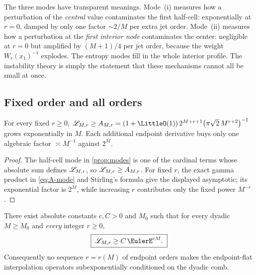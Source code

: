 The three modes have transparent meanings.  Mode~(i) measures how a
perturbation of the \emph{central} value contaminates the first
half-cell: exponentially at $r=0$, damped by only one factor
$\sim2/M$ per extra jet order.  Mode~(ii) measures how a perturbation
at the \emph{first interior node} contaminates the center: negligible
at $r=0$ but amplified by $(M+1)/4$ per jet order, because the weight
$W_r(x_1)^{-1}$ explodes.  The entropy modes fill in the whole
interior profile.  The instability theory is simply the statement
that these mechanisms cannot all be small at once.

\subsection{Fixed order and all orders}

\begin{theorem}
\label{thm:fixed-r}
For every fixed $r\ge0$,
$\Leb_{M,r}\ge A_{M,r}
=(1+\LittleO(1))\,2^{M+r+1}\bigl(\pi\sqrt2\,M^{r+2}\bigr)^{-1}$
grows exponentially in $M$.  Each additional endpoint derivative
buys only one algebraic factor $\asymp M^{-1}$ against $2^{M}$.
\end{theorem}

\begin{proof}
The half-cell mode in \cref{prop:modes} is one of the cardinal terms
whose absolute sum defines $\mathscr L_{M,r}$, so
$\mathscr L_{M,r}\ge A_{M,r}$.  For fixed $r$, the exact gamma product in
\eqref{eq:A-mode} and Stirling's formula give the displayed asymptotic;
its exponential factor is $2^M$, while increasing $r$ contributes only
the fixed power $M^{-r}$.
\end{proof}

\begin{theorem}
\label{thm:all-r}
There exist absolute constants $c,C>0$ and $M_0$ such that for every
dyadic $M\ge M_0$ and \emph{every} integer $r\ge0$,
\begin{equation}
 \boxed{\;\Leb_{M,r}\ge C\,\EulerE^{cM}.\;}
 \label{eq:all-r}
\end{equation}
Consequently no sequence $r=r(M)$ of endpoint orders makes the
endpoint-flat interpolation operators subexponentially conditioned on
the dyadic comb.
\end{theorem}

